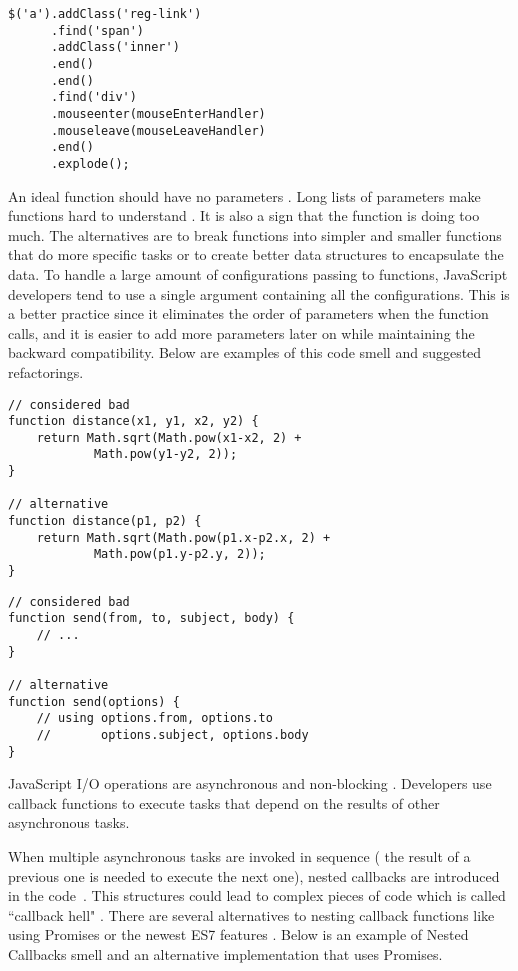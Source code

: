 \begin{lstlisting}
$('a').addClass('reg-link')
      .find('span')
      .addClass('inner')
      .end()
      .end()
      .find('div')
      .mouseenter(mouseEnterHandler)
      .mouseleave(mouseLeaveHandler)
      .end()
      .explode();
\end{lstlisting}


 An ideal function should have no parameters \cite{martin2009clean}. Long lists of parameters make functions hard to understand \cite{fontana2012automatic}. It is also a sign that the function is doing too much. The alternatives are to break functions into simpler and smaller functions that do more specific tasks or to create better data structures to encapsulate the data. To handle a large amount of configurations passing to functions, JavaScript developers tend to use a single argument containing all the configurations. This is a better practice since it eliminates the order of parameters when the function calls, and it is easier to add more parameters later on while maintaining the backward compatibility. Below are examples of this code smell and suggested refactorings.

\begin{lstlisting}
// considered bad
function distance(x1, y1, x2, y2) {
	return Math.sqrt(Math.pow(x1-x2, 2) +
			Math.pow(y1-y2, 2));
}

// alternative
function distance(p1, p2) {
	return Math.sqrt(Math.pow(p1.x-p2.x, 2) +
			Math.pow(p1.y-p2.y, 2));
}
\end{lstlisting}
\begin{lstlisting}
// considered bad
function send(from, to, subject, body) {
	// ...
}

// alternative
function send(options) {
	// using options.from, options.to
	//		 options.subject, options.body
}
\end{lstlisting}

\begin{sloppypar}
 JavaScript I/O operations are asynchronous and non-blocking \cite{griffin2011scaling}. Developers use callback functions to execute tasks that depend on the results of other asynchronous tasks. %
\end{sloppypar}
When multiple asynchronous tasks are invoked in sequence (\ie{} the result of a previous one
is needed to execute the next one), nested callbacks are introduced in the code~\cite{brodu2015toward, gallaba2015don}. This structures could lead to complex pieces of code which is called ``callback hell" \cite{ogden2015callback, brodu2015toward, fard2013jsnose}. There are several alternatives to nesting callback functions like using Promises \cite{brodu2015toward} or the newest ES7 features \cite{Jake2014es7}. Below is an example of Nested Callbacks smell and an alternative implementation that uses Promises.

